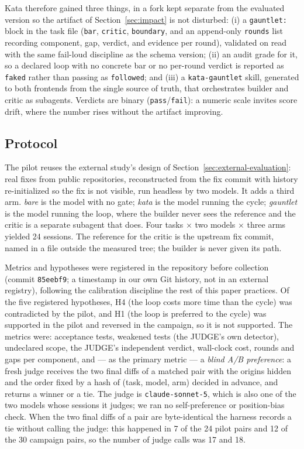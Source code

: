 \documentclass{sbc2019}%
\begin{document}
Kata therefore gained three things, in a fork kept separate from the evaluated
version so the artifact of Section~\ref{sec:impact} is not disturbed:
(i) a \texttt{gauntlet:} block in the task file
(\texttt{bar}, \texttt{critic}, \texttt{boundary}, and an append-only
\texttt{rounds} list recording component, gap, verdict, and evidence per round),
validated on read with the same fail-loud discipline as the schema version;
(ii) an audit grade for it, so a declared loop with no concrete bar or no
per-round verdict is reported as \texttt{faked} rather than passing as
\texttt{followed}; and (iii) a \texttt{kata-gauntlet} skill, generated to both
frontends from the single source of truth, that orchestrates builder and critic
as subagents. Verdicts are binary (\texttt{pass}/\texttt{fail}): a numeric
scale invites score drift, where the number rises without the artifact
improving.

\subsection{Protocol}

The pilot reuses the external study's design of
Section~\ref{sec:external-evaluation}: real fixes from public repositories,
reconstructed from the fix commit with history re-initialized so the fix is not
visible, run headless by two models. It adds a third arm. \emph{bare} is the
model with no gate; \emph{kata} is the model running the cycle; \emph{gauntlet}
is the model running the loop, where the builder never sees the reference and
the critic is a separate subagent that does. Four tasks $\times$ two models
$\times$ three arms yielded 24 sessions. The reference for the critic is the
upstream fix commit, named in a file outside the measured tree; the builder is
never given its path.

Metrics and hypotheses were registered in the repository before collection
(commit \texttt{85eebf9}; a timestamp in our own Git history, not in an
external registry), following the calibration discipline the rest of this
paper practices. Of the five registered hypotheses, H4 (the loop costs more time than the
cycle) was contradicted by the pilot, and H1 (the loop is preferred to the
cycle) was supported in the pilot and reversed in the campaign, so it is not
supported. The metrics were: acceptance tests, weakened tests
(the JUDGE's own detector), undeclared scope, the JUDGE's independent verdict,
wall-clock cost, rounds and gaps per component, and --- as the primary metric
--- a \emph{blind A/B preference}: a fresh judge receives the two final diffs of
a matched pair with the origins hidden and the order fixed by a hash of
(task, model, arm) decided in advance, and returns a winner or a tie. The judge is \texttt{claude-sonnet-5}, which
is also one of the two models whose sessions it judges; we ran no
self-preference or position-bias check. When the two final diffs of a pair
are byte-identical the harness records a tie without calling the judge: this
happened in 7 of the 24 pilot pairs and 12 of the 30 campaign pairs, so the
number of judge calls was 17 and 18.
\end{document}
